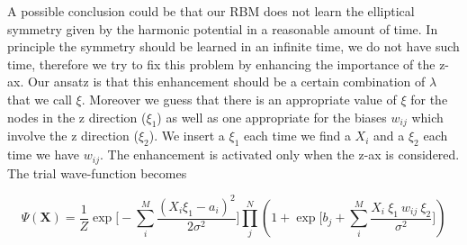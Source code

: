 A possible conclusion could be that our RBM does not learn the elliptical symmetry given by the harmonic potential in a reasonable amount of time. In principle the symmetry should be learned in an infinite time, we do not have such time, therefore we try to fix this problem by enhancing the importance of the z-ax. Our ansatz is that this enhancement should be a certain combination of $\lambda$ that we call $\xi$. Moreover we guess that there is an appropriate value of $\xi$ for the nodes in the z direction ($\xi_1$) as well as one appropriate for the biases $w_{ij}$ which involve the z direction ($\xi_2$). We insert a $\xi_1$ each time we find a $X_i$ and a $\xi_2$ each time we have $w_{ij}$. The enhancement is activated only when the z-ax is considered. The trial wave-function becomes

\begin{equation*}
	\label{new_trial_wf}
	\Psi(\mathbf{X}) = \frac{1}{Z} \exp\bigg[-\sum_i^M \frac{(X_i\xi_1-a_i)^2}{2\sigma^2}\bigg]\prod_j^N \left(  1 + \exp\bigg[b_j +\sum_i^M \frac{X_i\ \xi_1\ w_{ij}\ \xi_2}{\sigma^2}\bigg]\right)	
\end{equation*}

